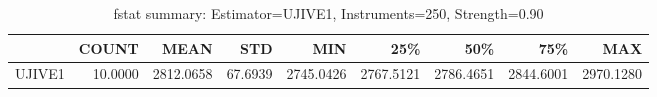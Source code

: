 \begin{table}[ht]
\centering
\caption{fstat summary: Estimator=UJIVE1, Instruments=250, Strength=0.90}
\begin{tabular}{lrrrrrrrr}
\toprule
 & COUNT & MEAN & STD & MIN & 25\% & 50\% & 75\% & MAX \\
\midrule
UJIVE1 & 10.0000 & 2812.0658 & 67.6939 & 2745.0426 & 2767.5121 & 2786.4651 & 2844.6001 & 2970.1280 \\
\bottomrule
\end{tabular}
\end{table}
